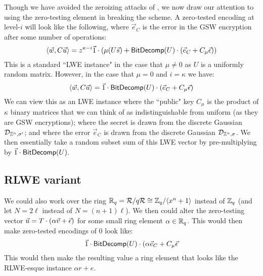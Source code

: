 Though we have avoided the zeroizing attacks of \cite{chl, cgh}, we now draw our attention to using the zero-testing element in breaking the scheme.  A zero-tested encoding at level-$i$ will look like the following, where $\vec{e}_C$ is the error in the GSW encryption after some number of operations:
$$\left<\vec{w}, C \vec{u}\right> = z^{\kappa-i}\vec{1}\cdot(\mu(U \vec{s}) + \mathsf{BitDecomp}(U)\cdot (\vec{e}_C + C_\mu\vec{\epsilon}))$$
This is a standard ``LWE instance" in the case that $\mu \not= 0$ as $U$ is a uniformly random matrix.  However, in the case that $\mu = 0$ and $i = \kappa$ we have:
\begin{equation}\label{eq:topleveltested}
\left<\vec{w}, C \vec{u}\right> = \vec{1}\cdot \mathsf{BitDecomp}(U)\cdot (\vec{e}_C + C_\mu\vec{\epsilon})
\end{equation}
We can view this as an LWE instance where the ``public" key $C_\mu$ is the product of $\kappa$ binary matrices that we can think of as indistinguishable from uniform (as they are GSW encryptions); where the secret is drawn from the discrete Gaussian $\mathcal{D}_{\mathbb{Z}^n, \sigma'}$; and where the error $\vec{e}_C$ is drawn from the discrete Gaussian $\mathcal{D}_{\mathbb{Z}^n, \sigma}$.  We then essentially take a random subset sum of this LWE vector by pre-multiplying by $\vec{1}\cdot\mathsf{BitDecomp}(U)$.

\subsection{RLWE variant}
We could also work over the ring $\mathbb{R}_q = \mathcal{R}/q\mathcal{R} \cong \mathbb{Z}_q/\langle x^n + 1 \rangle$ instead of $\mathbb{Z}_q$ (and let $N = 2\ell$ instead of $N = (n+1)\ell$).  We then could alter the zero-testing vector $\vec{u} = T\cdot(\alpha\vec{v} + \vec{\epsilon})$ for some small ring element $\alpha \in \mathbb{R}_q$.  This would then make zero-tested encodings of $0$ look like:
$$\vec{1}\cdot \mathsf{BitDecomp}(U)\cdot (\alpha\vec{e}_C + C_\mu\vec{\epsilon}$$
This would then make the resulting value a ring element that looks like the RLWE-esque instance $\alpha r + e$.


